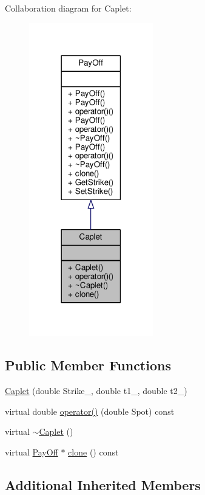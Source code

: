 Collaboration diagram for Caplet\+:
\nopagebreak
\begin{figure}[H]
\begin{center}
\leavevmode
\includegraphics[width=153pt]{classCaplet__coll__graph}
\end{center}
\end{figure}
\subsection*{Public Member Functions}
\begin{DoxyCompactItemize}
\item 
\hyperlink{classCaplet_a350941f2d902ebcc9332bd2dc33e442a}{Caplet} (double Strike\+\_\+, double t1\+\_\+, double t2\+\_\+)
\item 
virtual double \hyperlink{classCaplet_a6b75d621f3c7631b50b7486306466daa}{operator()} (double Spot) const
\item 
virtual \hyperlink{classCaplet_ac0fad0b6aeef3bd1d2d88d280ebd5072}{$\sim$\+Caplet} ()
\item 
virtual \hyperlink{classPayOff}{Pay\+Off} $\ast$ \hyperlink{classCaplet_aeadd950733f02c066c474badceb277ef}{clone} () const
\end{DoxyCompactItemize}
\subsection*{Additional Inherited Members}


